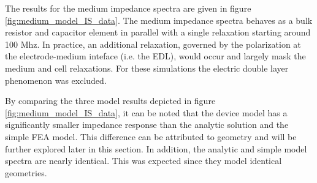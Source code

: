 \par The results for the medium impedance spectra are given in figure \ref{fig:medium_model_IS_data}. The medium impedance spectra behaves as a bulk resistor and capacitor element in parallel with a single relaxation starting around 100 Mhz. In practice, an additional relaxation, governed by the polarization at the electrode-medium inteface (i.e. the EDL), would occur and largely mask the medium and cell relaxations. For these simulations the electric double layer phenomenon was excluded.

\par By comparing the three model results depicted in figure \ref{fig:medium_model_IS_data}, it can be noted that the device model has a significantly smaller impedance response than the analytic solution and the simple FEA model. This difference can be attributed to geometry and will be further explored later in this section. In addition, the analytic and simple model spectra are nearly identical. This was expected since they model identical geometries.

